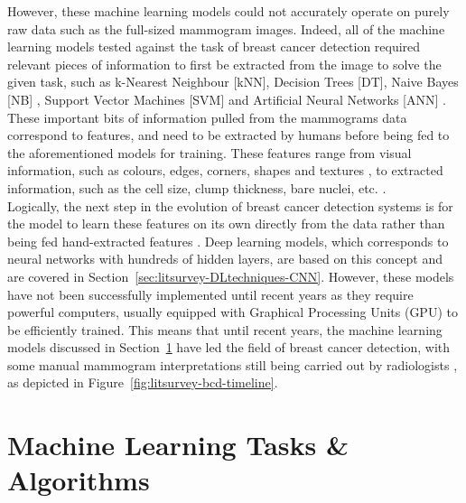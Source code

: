 However, these machine learning models could not accurately operate on purely raw data such as the full-sized mammogram images. Indeed, all of the machine learning models tested against the task of breast cancer detection required relevant pieces of information to first be extracted from the image to solve the given task, such as k-Nearest Neighbour [kNN], Decision Trees [DT], Naive Bayes [NB] \citep{Asri2016}, Support Vector Machines [SVM] \citep{Ramos-Pollan2012} and Artificial Neural Networks [ANN] \citep{Yue2018}. These important bits of information pulled from the mammograms data correspond to features, and need to be extracted by humans before being fed to the aforementioned models for training. These features range from visual information, such as colours, edges, corners, shapes and textures \citep{Geron2019}, to extracted information, such as the cell size, clump thickness, bare  nuclei, etc. \citep{Yue2018}.\\

Logically, the next step in the evolution of breast cancer detection systems is for the model to learn these features on its own directly from the data rather than being fed hand-extracted features \citep{Yala2019}. Deep learning models, which corresponds to neural networks with hundreds of hidden layers, are based on this concept and are covered in Section~\ref{sec:litsurvey-DLtechniques-CNN}. However, these models have not been successfully implemented until recent years as they require powerful computers, usually equipped with Graphical Processing Units (GPU) to be efficiently trained. This means that until recent years, the machine learning models discussed in Section~\ref{sec:litreview-MLmodel-BCDapplications} have led the field of breast cancer detection, with some manual mammogram interpretations still being carried out by radiologists \citep{Litjens2017}, as depicted in Figure~\ref{fig:litsurvey-bcd-timeline}.



\section{Machine Learning Tasks \& Algorithms}
\label{sec:litreview-MLmodel-BCDapplications}

